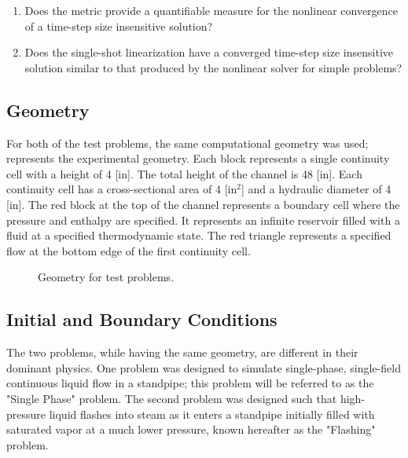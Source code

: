 \begin{enumerate}
\item{Does the metric provide a quantifiable measure for the nonlinear convergence of a time-step size insensitive solution?}
\item{Does the single-shot linearization have a converged time-step size insensitive solution similar to that produced by the nonlinear solver for simple problems?}
\end{enumerate}

\subsection{Geometry}
\label{subsect:experimental_geometry}
For both of the test problems, the same computational geometry was used;   represents the experimental geometry.
Each block represents a single continuity cell with a height of 4 [in].
The total height of the channel is 48 [in].
Each continuity cell has a cross-sectional area of 4 [in$^2$] and a hydraulic diameter of 4 [in].
The red block at the top of the channel represents a boundary cell where the pressure and enthalpy are specified.
It represents an infinite reservoir filled with a fluid at a specified thermodynamic state.
The red triangle represents a specified flow at the bottom edge of the first continuity cell. 

\begin{figure}[h!t]
\begin{center}
\end{center}
\caption{Geometry for test problems.}
\label{fig:exp_geometry}
\end{figure}

\subsection{Initial and Boundary Conditions}
\label{subsect:ic_bc}

The two problems, while having the same geometry, are different in their dominant physics.
One problem was designed to simulate single-phase, single-field continuous liquid flow in a standpipe; this problem will be referred to as the "Single Phase" problem.
The second problem was designed such that high-pressure liquid flashes into steam as it enters a standpipe initially filled with saturated vapor at a much lower pressure, known hereafter as the "Flashing" problem.

